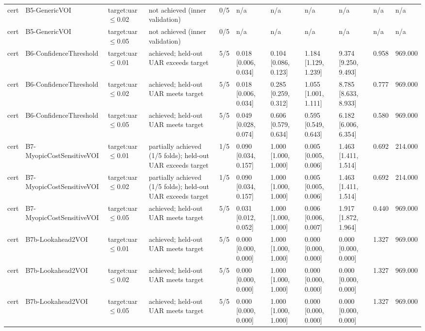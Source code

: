 \begin{table}[!ht]
{\begin{tabular}{lllllllllll}
cert & B5-GenericVOI & target:uar$\le$0.02 & not achieved (inner validation) & 0/5 & n/a & n/a & n/a & n/a & n/a & n/a \\
cert & B5-GenericVOI & target:uar$\le$0.05 & not achieved (inner validation) & 0/5 & n/a & n/a & n/a & n/a & n/a & n/a \\
cert & B6-ConfidenceThreshold & target:uar$\le$0.01 & achieved; held-out UAR exceeds target & 5/5 & 0.018 [0.006, 0.034] & 0.104 [0.086, 0.123] & 1.184 [1.129, 1.239] & 9.374 [9.250, 9.493] & 0.958 & 969.000 \\
cert & B6-ConfidenceThreshold & target:uar$\le$0.02 & achieved; held-out UAR meets target & 5/5 & 0.018 [0.006, 0.034] & 0.285 [0.259, 0.312] & 1.055 [1.001, 1.111] & 8.785 [8.633, 8.933] & 0.777 & 969.000 \\
cert & B6-ConfidenceThreshold & target:uar$\le$0.05 & achieved; held-out UAR meets target & 5/5 & 0.049 [0.028, 0.074] & 0.606 [0.579, 0.634] & 0.595 [0.549, 0.643] & 6.182 [6.006, 6.354] & 0.580 & 969.000 \\
cert & B7-MyopicCostSensitiveVOI & target:uar$\le$0.01 & partially achieved (1/5 folds); held-out UAR exceeds target & 1/5 & 0.090 [0.034, 0.157] & 1.000 [1.000, 1.000] & 0.005 [0.005, 0.006] & 1.463 [1.411, 1.514] & 0.692 & 214.000 \\
cert & B7-MyopicCostSensitiveVOI & target:uar$\le$0.02 & partially achieved (1/5 folds); held-out UAR exceeds target & 1/5 & 0.090 [0.034, 0.157] & 1.000 [1.000, 1.000] & 0.005 [0.005, 0.006] & 1.463 [1.411, 1.514] & 0.692 & 214.000 \\
cert & B7-MyopicCostSensitiveVOI & target:uar$\le$0.05 & achieved; held-out UAR meets target & 5/5 & 0.031 [0.012, 0.052] & 1.000 [1.000, 1.000] & 0.006 [0.006, 0.007] & 1.917 [1.872, 1.964] & 0.440 & 969.000 \\
cert & B7b-Lookahead2VOI & target:uar$\le$0.01 & achieved; held-out UAR meets target & 5/5 & 0.000 [0.000, 0.000] & 1.000 [1.000, 1.000] & 0.000 [0.000, 0.000] & 0.000 [0.000, 0.000] & 1.327 & 969.000 \\
cert & B7b-Lookahead2VOI & target:uar$\le$0.02 & achieved; held-out UAR meets target & 5/5 & 0.000 [0.000, 0.000] & 1.000 [1.000, 1.000] & 0.000 [0.000, 0.000] & 0.000 [0.000, 0.000] & 1.327 & 969.000 \\
cert & B7b-Lookahead2VOI & target:uar$\le$0.05 & achieved; held-out UAR meets target & 5/5 & 0.000 [0.000, 0.000] & 1.000 [1.000, 1.000] & 0.000 [0.000, 0.000] & 0.000 [0.000, 0.000] & 1.327 & 969.000 \\

\end{tabular}}
\end{table}
